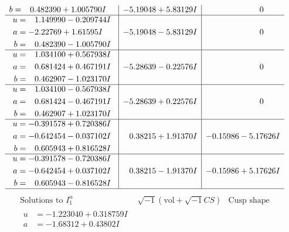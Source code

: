 \documentclass[1p]{elsarticle_modified}
\theoremstyle{definition}
\newcommand{\I}{\sqrt{-1}}
\begin{document}
$$\begin{array}{c|c|c}
\begin{aligned}
b &= \phantom{-}0.482390 + 1.005790 I\end{aligned}
 & -5.19048 + 5.83129 I & \phantom{-0.000000 } 0 \\ \hline\begin{aligned}
u &= \phantom{-}1.149990 - 0.209744 I \\
a &= -2.22769 + 1.61595 I \\
b &= \phantom{-}0.482390 - 1.005790 I\end{aligned}
 & -5.19048 - 5.83129 I & \phantom{-0.000000 } 0 \\ \hline\begin{aligned}
u &= \phantom{-}1.034100 + 0.567938 I \\
a &= \phantom{-}0.681424 + 0.467191 I \\
b &= \phantom{-}0.462907 - 1.023170 I\end{aligned}
 & -5.28639 - 0.22576 I & \phantom{-0.000000 } 0 \\ \hline\begin{aligned}
u &= \phantom{-}1.034100 - 0.567938 I \\
a &= \phantom{-}0.681424 - 0.467191 I \\
b &= \phantom{-}0.462907 + 1.023170 I\end{aligned}
 & -5.28639 + 0.22576 I & \phantom{-0.000000 } 0 \\ \hline\begin{aligned}
u &= -0.391578 + 0.720386 I \\
a &= -0.642454 - 0.037102 I \\
b &= \phantom{-}0.605943 + 0.816528 I\end{aligned}
 & \phantom{-}0.38215 + 1.91370 I & -0.15986 - 5.17626 I \\ \hline\begin{aligned}
u &= -0.391578 - 0.720386 I \\
a &= -0.642454 + 0.037102 I \\
b &= \phantom{-}0.605943 - 0.816528 I\end{aligned}
 & \phantom{-}0.38215 - 1.91370 I & -0.15986 + 5.17626 I\\
 \hline 
 \end{array}$$\newpage$$\begin{array}{c|c|c}  
\text{Solutions to }I^u_{1}& \I (\text{vol} + \sqrt{-1}CS) & \text{Cusp shape}\\
 \hline 
\begin{aligned}
u &= -1.223040 + 0.318759 I \\
a &= -1.68312 + 0.43802 I \\

\end{aligned}
\end{array}$$
\end{document}
